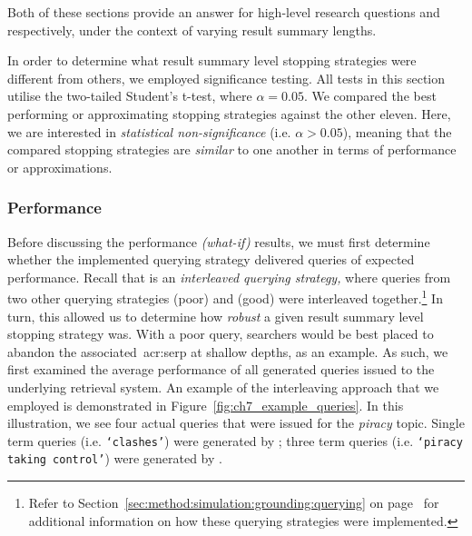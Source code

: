 Both of these sections provide an answer for high-level research questions  and  respectively, under the context of varying result summary lengths.

In order to determine what result summary level stopping strategies were different from others, we employed significance testing. All tests in this section utilise the two-tailed Student's t-test, where $\alpha=0.05$. We compared the best performing or approximating stopping strategies against the other eleven. Here, we are interested in \emph{statistical non-significance} (i.e. $\alpha > 0.05$), meaning that the compared stopping strategies are \emph{similar} to one another in terms of performance or approximations.

\subsubsection{Performance}\label{sec:snippets:simulations:results:perf}
Before discussing the performance \emph{(what-if)} results, we must first determine whether the implemented querying strategy  delivered queries of expected performance. Recall that  is an \emph{interleaved querying strategy,} where queries from two other querying strategies  (poor) and  (good) were interleaved together.\footnote{Refer to Section~\ref{sec:method:simulation:grounding:querying} on page~\pageref{sec:method:simulation:grounding:querying} for additional information on how these querying strategies were implemented.} In turn, this allowed us to determine how \emph{robust} a given result summary level stopping strategy was. With a poor query, searchers would be best placed to abandon the associated~\gls{acr:serp} at shallow depths, as an example. As such, we first examined the average performance of all generated queries issued to the underlying retrieval system. An example of the interleaving approach that we employed is demonstrated in Figure~\ref{fig:ch7_example_queries}. In this illustration, we see four actual queries that were issued for the \emph{piracy} topic. Single term queries (i.e. \texttt{`clashes'}) were generated by ; three term queries (i.e. \texttt{`piracy taking control'}) were generated by .

